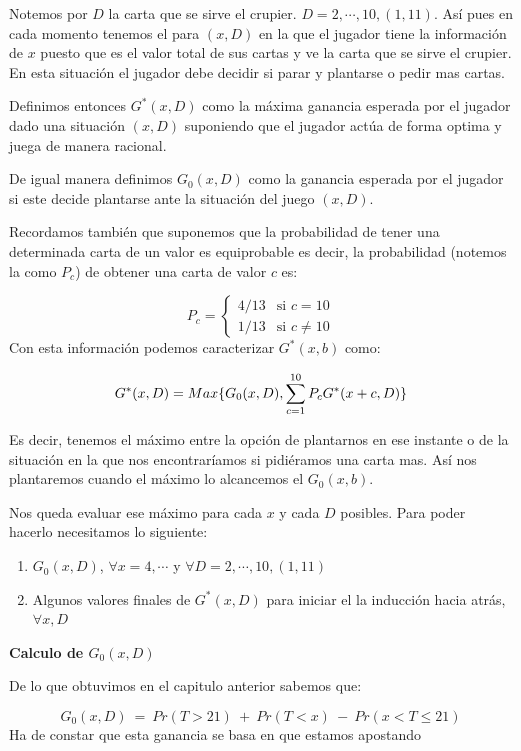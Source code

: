 \documentclass[12pt,a4paper,]{book}
\numberwithin{dummy}{section}
\theoremstyle{ocrenumbox}
\theoremstyle{blacknumex}
\theoremstyle{blacknumbox}
\theoremstyle{ocrenum}
\theoremstyle{ocrenum}
\begin{document}
Notemos por \(D\) la carta que se sirve el crupier.
\(D = 2, \cdots, 10, (1,11)\). Así pues en cada momento tenemos el para
\((x,D)\) en la que el jugador tiene la información de \(x\) puesto que
es el valor total de sus cartas y ve la carta que se sirve el crupier.
En esta situación el jugador debe decidir si parar y plantarse o pedir
mas cartas.

Definimos entonces \(G^*(x,D)\) como la máxima ganancia esperada por el
jugador dado una situación \((x,D)\) suponiendo que el jugador actúa de
forma optima y juega de manera racional.

De igual manera definimos \(G_0(x,D)\) como la ganancia esperada por el
jugador si este decide plantarse ante la situación del juego \((x,D)\).

Recordamos también que suponemos que la probabilidad de tener una
determinada carta de un valor es equiprobable es decir, la probabilidad
(notemos la como \(P_c\)) de obtener una carta de valor \(c\) es:

\[
P_c = 
\begin{cases}
4/13 & \text{si } c=10 \\
1/13 & \text{si } c \neq 10
\end{cases}
\] Con esta información podemos caracterizar \(G^*(x,b)\) como:

\[
G^*(x,D) = Max \\ \{G_0(x,D), \sum_{c=1}^{10}P_cG^*(x+c,D) \}
\]

Es decir, tenemos el máximo entre la opción de plantarnos en ese
instante o de la situación en la que nos encontraríamos si pidiéramos
una carta mas. Así nos plantaremos cuando el máximo lo alcancemos el
\(G_0(x,b)\).

Nos queda evaluar ese máximo para cada \(x\) y cada \(D\) posibles. Para
poder hacerlo necesitamos lo siguiente:

\begin{enumerate}
\def\labelenumi{\arabic{enumi}.}
\item
  \(G_0(x,D)\), \(\forall x=4, \cdots\) y
  \(\forall D= 2, \cdots, 10, (1,11)\)
\item
  Algunos valores finales de \(G^*(x,D)\) para iniciar el la inducción
  hacia atrás, \(\forall x,D\)
\end{enumerate}

\textbf{Calculo de \(G_0(x,D)\)}

De lo que obtuvimos en el capitulo anterior sabemos que:

\[ 
G_0(x,D) \ = \ Pr(T>21) \ + \ Pr(T<x) \ - \ Pr(x<T \leq 21) 
\] Ha de constar que esta ganancia se basa en que estamos apostando
\end{document}
